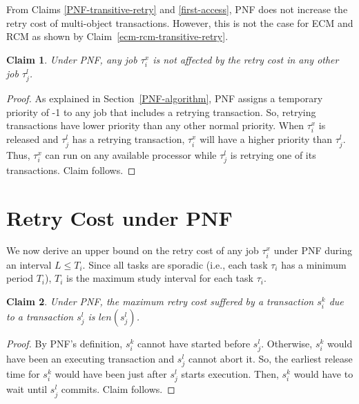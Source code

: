 \documentclass[12pt,english]{report}
\newtheorem{clm}{Claim}
\newtheorem{proof}{Proof}
\begin{document}
From Claims \ref{PNF-transitive-retry} and \ref{first-access}, PNF does not increase the retry cost of multi-object transactions. However, this is not the case for ECM and RCM as shown by Claim~\ref{ecm-rcm-transitive-retry}. 

\begin{clm}\label{higher retry does not affect response}
Under PNF, any job $\tau_{i}^{x}$ is not affected by the retry cost in any other
job $\tau_{j}^{l}$.
\end{clm}
\begin{proof}\normalfont
As explained in Section~\ref{PNF-algorithm}, PNF assigns a temporary priority of -1 to any job that includes a retrying transaction. So, retrying transactions have lower priority than any other normal priority.
When $\tau_{i}^{x}$ is released and $\tau_j^l$ has a retrying transaction, $\tau_i^x$ will have a higher priority
than $\tau_j^l$. Thus, $\tau_i^x$ can run on any available processor while $\tau_j^l$ is retrying one of its transactions. Claim follows.
\end{proof}


\section{Retry Cost under PNF}\label{rc pnf sec}

We now derive an upper bound on the retry cost of any job $\tau_i^x$ under PNF during an interval $L\le T_i$. Since all tasks are sporadic (i.e., each task $\tau_i$ has a minimum period $T_i$), $T_i$ is the maximum study interval for each task $\tau_i$.

\begin{clm}\label{two transactions retry cost PNF}
Under PNF, the maximum retry cost suffered by a transaction $s_{i}^{k}$ due 
to a transaction $s_{j}^{l}$ is $len(s_{j}^{l})$.
\end{clm}
\begin{proof}\normalfont
By PNF's definition, $s_{i}^{k}$ cannot have started before
$s_{j}^{l}$. Otherwise, $s_i^k$ would have been an executing transaction and $s_{j}^{l}$ cannot abort it. So, the earliest release time for $s_{i}^{k}$ would have been just after $s_{j}^{l}$ starts execution. Then, $s_i^k$ would have to wait until $s_{j}^{l}$
commits. Claim follows.
\end{proof}
\end{document}
